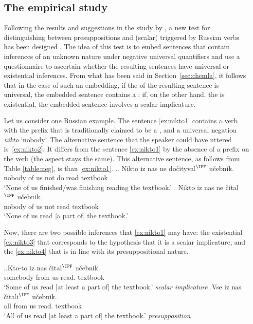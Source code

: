 \subsection{The empirical study}\label{empirical}
Following the results and suggestions in the study by \citet{Chemla:09}, a new test for distinguishing between presuppositions and (scalar)  triggered by Russian verbs has been designed \citep{ZinovaFilip:SALT}. The idea of this test is to embed sentences that contain inferences of an unknown nature under negative universal quantifiers and use a questionnaire to ascertain whether the resulting sentences have universal or existential inferences. From what has been said in Section~\ref{sec:chemla}, it follows that in the case of such an embedding, if the  of the resulting sentence is universal, the embedded sentence contains a ; if, on the other hand, the  is existential, the embedded sentence involves a scalar implicature.\largerpage[2]

Let us consider one Russian example. The sentence \ref{ex:nikto1} contains a verb with the  prefix  that is traditionally claimed to be a , and a universal negation \textit{nikto} `nobody'. The alternative sentence that the speaker could have uttered is~\ref{ex:nikto2}. It differs from the sentence \ref{ex:nikto1} by the absence of a prefix on the verb (the aspect stays the same). This alternative sentence, as follows from Table \ref{table:neg}, is  than \ref{ex:nikto1}.
\ex.\label{ex:nikto}\ag. \label{ex:nikto1}Nikto iz nas ne do\v{c}ityval$^{\IPF}$ u\v{c}ebnik.\\
nobody of us not do.read textbook\\
 `None of us finished/was finishing reading the textbook.'
\bg. \label{ex:nikto2}Nikto iz nas ne \v{c}ital$^{\IPF}$ u\v{c}ebnik.\\
nobody of us not read textbook\\
 `None of us read $[$a part of$]$ the textbook.'

Now, there are two possible inferences that \ref{ex:nikto1} may have: the existential  \ref{ex:nikto3} that corresponds to the hypothesis that it is a scalar implicature, and the  \ref{ex:nikto4} that is in line with its presuppositional nature.

\ex.\ag.\label{ex:nikto3}Kto-to iz nas \v{c}ital$^{\IPF}$ u\v{c}ebnik.\\
somebody from us read. textbook\\
`Some of us read $[$at least a part of$]$ the textbook.' \hfill \textit{scalar implicature}
\bg.\label{ex:nikto4}Vse iz nas \v{c}itali$^{\IPF}$ u\v{c}ebnik.\\
all from us read. textbook\\
`All of us read $[$at least a part of$]$ the textbook.' \hfill \textit{presupposition}

